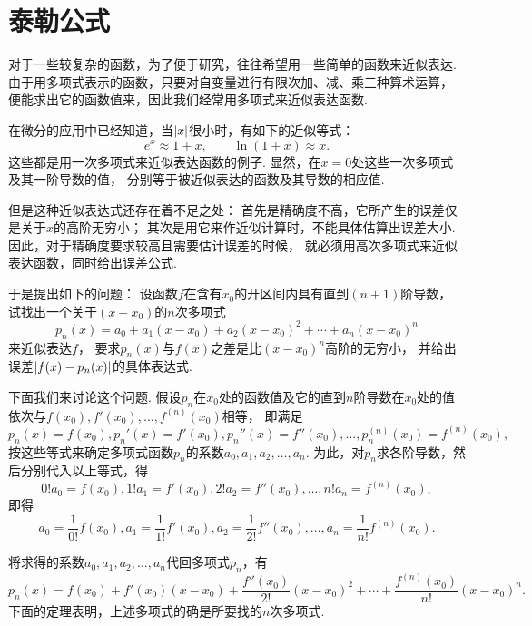 \section{泰勒公式}\label{section:微分中值定理.泰勒公式}
对于一些较复杂的函数，为了便于研究，往往希望用一些简单的函数来近似表达.
由于用多项式表示的函数，只要对自变量进行有限次加、减、乘三种算术运算，
便能求出它的函数值来，因此我们经常用多项式来近似表达函数.

在微分的应用中已经知道，当\(\abs{x}\)很小时，有如下的近似等式：\[
	e^x \approx 1+x, \qquad
	\ln(1+x) \approx x.
\]
这些都是用一次多项式来近似表达函数的例子.
显然，在\(x=0\)处这些一次多项式及其一阶导数的值，
分别等于被近似表达的函数及其导数的相应值.

但是这种近似表达式还存在着不足之处：
首先是精确度不高，它所产生的误差仅是关于\(x\)的高阶无穷小；
其次是用它来作近似计算时，不能具体估算出误差大小.
因此，对于精确度要求较高且需要估计误差的时候，
就必须用高次多项式来近似表达函数，同时给出误差公式.

于是提出如下的问题：
设函数\(f\)在含有\(x_0\)的开区间内具有直到\((n+1)\)阶导数，
试找出一个关于\((x-x_0)\)的\(n\)次多项式\[
	p_n(x)
	= a_0 + a_1 (x-x_0) + a_2 (x-x_0)^2 + \dotsb + a_n (x-x_0)^n
\]来近似表达\(f\)，
要求\(p_n(x)\)与\(f(x)\)之差是比\((x-x_0)^n\)高阶的无穷小，
并给出误差\(\abs{f(x) - p_n(x)}\)的具体表达式.

下面我们来讨论这个问题.
假设\(p_n\)在\(x_0\)处的函数值及它的直到\(n\)阶导数在\(x_0\)处的值
依次与\(f(x_0),f'(x_0),\dotsc,f^{(n)}(x_0)\)相等，
即满足\[
	p_n(x) = f(x_0),
	p_n'(x) = f'(x_0),
	p_n''(x) = f''(x_0),
	\dotsc,
	p_n^{(n)}(x_0) = f^{(n)}(x_0),
\]
按这些等式来确定多项式函数\(p_n\)的系数\(a_0,a_1,a_2,\dotsc,a_n\).
为此，对\(p_n\)求各阶导数，然后分别代入以上等式，得\[
	0! a_0 = f(x_0),
	1! a_1 = f'(x_0),
	2! a_2 = f''(x_0),
	\dotsc,
	n! a_n = f^{(n)}(x_0),
\]
即得\[
	a_0 = \frac1{0!} f(x_0),
	a_1 = \frac1{1!} f'(x_0),
	a_2 = \frac1{2!} f''(x_0),
	\dotsc,
	a_n = \frac1{n!} f^{(n)}(x_0).
\]

将求得的系数\(a_0,a_1,a_2,\dotsc,a_n\)代回多项式\(p_n\)，有\[
	p_n(x) = f(x_0) + f'(x_0) (x-x_0)
	+ \frac{f''(x_0)}{2!} (x-x_0)^2
	+ \dotsb
	+ \frac{f^{(n)}(x_0)}{n!} (x-x_0)^n.
\]
下面的定理表明，上述多项式的确是所要找的\(n\)次多项式.

